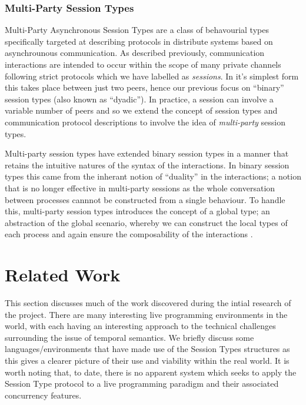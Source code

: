 \documentclass[11pt, abstracton, twoside, titlepage=true]{scrartcl}
\begin{document}
\subsubsection{Multi-Party Session Types}
Multi-Party Asynchronous Session Types are a class of behavourial types
specifically targeted at describing protocols in distribute systems
based on asynchrounous communication\cite{CCPY15}. As described previously,
communication interactions are intended to occur within the scope of many
private channels following strict protocols which we have labelled as
\emph{sessions}. In it's simplest form this takes place between just two
peers, hence our previous focus on ``binary'' session types (also known as
``dyadic''). In practice, a session can involve a variable number of peers
and so we extend the concept of session types and communication protocol
descriptions to involve the idea of \emph{multi-party} session types.

Multi-party session types have extended binary session types in a manner
that retains the intuitive natures of the syntax of the interactions. In
binary session types this came from the inherant notion of ``duality'' in
the interactions; a notion that is no longer effective in multi-party 
sessions as the whole conversation between processes cannnot be constructed
from a single behaviour. To handle this, multi-party session types
introduces the concept of a global type; an abstraction of the global
scenario, whereby we can construct the local types of each process and
again ensure the composability of the interactions \cite{HYC08}. 
\newpage

\section{Related Work}
\thispagestyle{empty}
This section discusses much of the work discovered during the intial research 
of the project. There are many interesting live programming environments in
the world, with each having an interesting approach to the technical 
challenges surrounding the issue of temporal semantics. We briefly discuss 
some languages/environments that have made use of the Session Types structures 
as this gives a clearer picture of their use and 
viability within the real world. It is worth noting that, to date, there is no 
apparent system which seeks to apply the Session Type protocol to a live 
programming paradigm and their associated concurrency features.
\end{document}
